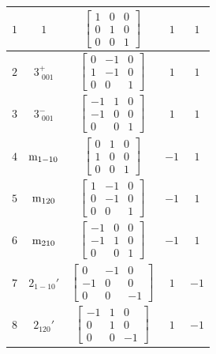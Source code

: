 \documentclass[fleqn,8pt]{jsarticle}
\begin{document}
\begin{longtable}{ccccc}
$ 1 $ & $ 1 $ & $ \begin{bmatrix} 1 & 0 & 0 \\ 0 & 1 & 0 \\ 0 & 0 & 1 \end{bmatrix} $ & $ 1 $ & $ 1 $ \\ \hline
$ 2 $ & $ 3^{+}_{\,\,001} $ & $ \begin{bmatrix} 0 & -1 & 0 \\ 1 & -1 & 0 \\ 0 & 0 & 1 \end{bmatrix} $ & $ 1 $ & $ 1 $ \\ \hline
$ 3 $ & $ 3^{-}_{\,\,001} $ & $ \begin{bmatrix} -1 & 1 & 0 \\ -1 & 0 & 0 \\ 0 & 0 & 1 \end{bmatrix} $ & $ 1 $ & $ 1 $ \\ \hline
$ 4 $ & $ {\rm m}_{1-10} $ & $ \begin{bmatrix} 0 & 1 & 0 \\ 1 & 0 & 0 \\ 0 & 0 & 1 \end{bmatrix} $ & $ -1 $ & $ 1 $ \\ \hline
$ 5 $ & $ {\rm m}_{120} $ & $ \begin{bmatrix} 1 & -1 & 0 \\ 0 & -1 & 0 \\ 0 & 0 & 1 \end{bmatrix} $ & $ -1 $ & $ 1 $ \\ \hline
$ 6 $ & $ {\rm m}_{210} $ & $ \begin{bmatrix} -1 & 0 & 0 \\ -1 & 1 & 0 \\ 0 & 0 & 1 \end{bmatrix} $ & $ -1 $ & $ 1 $ \\ \hline
$ 7 $ & $ 2{}_{1-10}{}' $ & $ \begin{bmatrix} 0 & -1 & 0 \\ -1 & 0 & 0 \\ 0 & 0 & -1 \end{bmatrix} $ & $ 1 $ & $ -1 $ \\ \hline
$ 8 $ & $ 2{}_{120}{}' $ & $ \begin{bmatrix} -1 & 1 & 0 \\ 0 & 1 & 0 \\ 0 & 0 & -1 \end{bmatrix} $ & $ 1 $ & $ -1 $ \\ \hline

\end{longtable}
\end{document}
